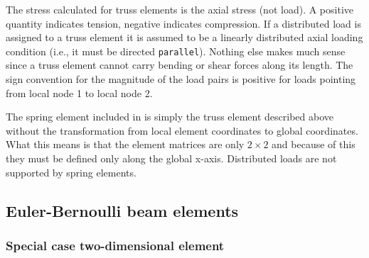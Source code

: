 The stress calculated for truss elements is the axial stress (not load).  
A positive quantity indicates tension, negative indicates compression.  
If a distributed load is assigned to a truss element it is assumed to be a 
linearly distributed axial loading condition (i.e., it must be directed
{\tt parallel}).  Nothing else makes much sense 
since a truss element cannot carry bending or shear forces along its length.  
The sign convention for the magnitude of the load pairs is positive for loads 
pointing from local node 1 to local node 2.

The spring element included in \felt{} is simply the truss element described
above without the transformation from local element coordinates to global
coordinates.  What this means is that the element matrices are only
$2 \times 2$ and because of this they must be defined only along the global
x-axis.  Distributed loads are not supported by spring elements.

\subsection{Euler-Bernoulli beam elements}
\label{elements.beam}

\subsubsection{Special case two-dimensional element}

